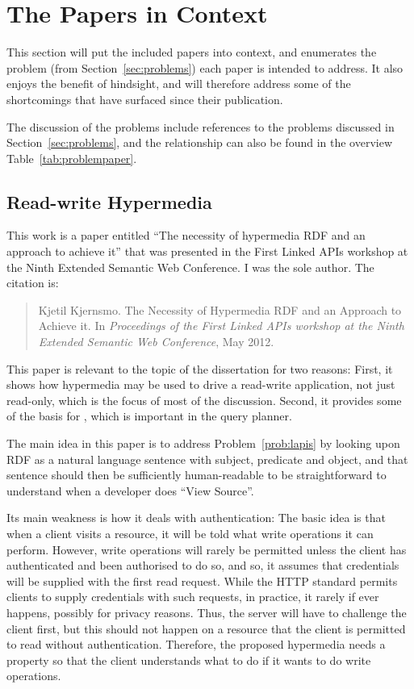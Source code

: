 \section{The Papers in Context}\label{sec:papersincontext}

This section will put the included papers into context, and enumerates
the problem (from Section~\ref{sec:problems}) each paper is intended
to address. It also enjoys the benefit of hindsight, and will
therefore address some of the shortcomings that have surfaced since
their publication.

The discussion of the problems include references to the problems
discussed in Section~\ref{sec:problems}, and the relationship can also
be found in the overview Table~\ref{tab:problempaper}.

\subsection{Read-write Hypermedia}\label{sec:conlapis}

This work is a paper entitled ``The necessity of hypermedia RDF and an
approach to achieve it'' that was presented in the First Linked APIs
workshop at the Ninth Extended Semantic Web Conference. I was the sole
author. The citation is:

\begin{quote}
Kjetil Kjernsmo.
\newblock The Necessity of Hypermedia RDF and an Approach to Achieve it.
\newblock In {\em Proceedings of the First Linked APIs workshop at the Ninth
  Extended Semantic Web Conference}, May 2012.
\end{quote}

This paper is relevant to the topic of the dissertation for two
reasons: First, it shows how hypermedia may be used to drive a
read-write application, not just read-only, which is the focus of most
of the discussion. Second, it provides some of the basis for
\cite{ldf1}, which is important in the query planner.

The main idea in this paper is to address Problem~\ref{prob:lapis} 
by looking upon RDF as a natural language
sentence with subject, predicate and object, and that sentence should
then be sufficiently human-readable to be straightforward to
understand when a developer does ``View Source''.

Its main weakness is how it deals with authentication: The basic idea
is that when a client visits a resource, it will be told what
write operations it can perform. However, write operations will rarely
be permitted unless the client has authenticated and been authorised
to do so, and so, it assumes that credentials will be supplied with
the first read request. While the HTTP standard permits clients to
supply credentials with such requests, in practice, it rarely if ever
happens, possibly for privacy reasons. Thus, the server will have to
challenge the client first, but this should not happen on a resource
that the client is permitted to read without authentication. 
Therefore, the proposed hypermedia needs a property so that the client
understands what to do if it wants to do write operations.

